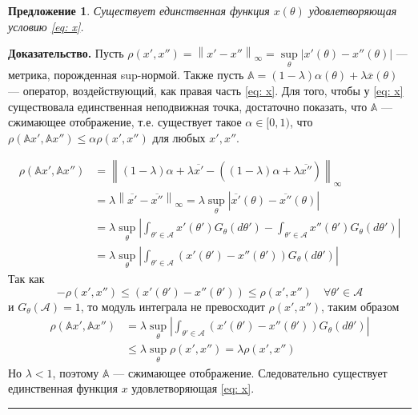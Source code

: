 \documentclass[12pt]{article}
\newtheorem{proposition}{Предложение}
\newenvironment{proof}[1][Доказательство]{\noindent\textbf{#1.} }{\ \rule{0.5em}{0.5em}}
\newcommand\norm[1]{\left\lVert#1\right\rVert}
\newcommand\abs[1]{\left\lvert#1\right\rvert}
\begin{document}
\begin{proposition}
Существует единственная функция $x(\theta)$ удовлетворяющая условию \eqref{eq: x}.
\end{proposition}
\begin{proof}
Пусть $\rho(x', x'') = \norm{x' - x''}_\infty = \sup\limits_\theta \abs{x'(\theta) - x''(\theta)}$ --- метрика,  порожденная sup-нормой. Также пусть $\mathbb{A} = (1-\lambda)\alpha(\theta) + \lambda \overline{x}(\theta)$ --- оператор,  воздействующий, как правая часть \eqref{eq: x}.  Для того,  чтобы у \eqref{eq: x} существовала единственная неподвижная точка,  достаточно показать, что $\mathbb{A}$ --- сжимающее отображение,  т.е.  существует такое $\alpha \in [0, 1)$, что $\rho(\mathbb{A}x',\mathbb{A}x'') \leqslant \alpha \rho(x', x'')$ для любых $x', x''$.

\begin{align*}
\rho(\mathbb{A}x',\mathbb{A}x'') &= \norm{(1-\lambda)\alpha + \lambda \overline{x'} - ((1-\lambda)\alpha + \lambda \overline{x''})}_\infty \\
&= \lambda \norm{\overline{x'} - \overline{x''}}_\infty 
= \lambda \sup\limits_\theta \abs{\overline{x'}(\theta) - \overline{x''}(\theta)} \\
&= \lambda \sup\limits_\theta \abs{\int_{\theta' \in \mathcal{A}} x'(\theta') G_\theta(d \theta') - \int_{\theta' \in \mathcal{A}} x''(\theta') G_\theta(d \theta')} \\
&= \lambda \sup\limits_\theta \abs{\int_{\theta' \in \mathcal{A}} (x'(\theta') - x''(\theta')) G_\theta(d \theta')}
\end{align*}
Так как 
$$
-\rho(x', x'') \leqslant (x'(\theta') - x''(\theta')) \leqslant \rho(x', x'') \quad \forall \theta' \in \mathcal{A}
$$
и $G_\theta(\mathcal{A}) = 1$, то модуль интеграла не превосходит $ \rho(x', x'')$,  таким образом
\begin{align*}
\rho(\mathbb{A}x',\mathbb{A}x'') 
&= \lambda \sup\limits_\theta \abs{\int_{\theta' \in \mathcal{A}} (x'(\theta') - x''(\theta')) G_\theta(d \theta')} \\
&\leqslant \lambda \sup\limits_\theta \rho(x', x'') =  \lambda \rho(x', x'')
\end{align*}
Но $\lambda < 1$,  поэтому $\mathbb{A}$ --- сжимающее отображение.  Следовательно существует единственная функция $x$ удовлетворяющая \eqref{eq: x}.
\end{proof}
\end{document}
